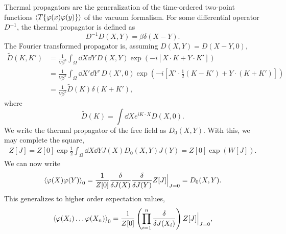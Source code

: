 Thermal propagators are the generalization of the time-ordered two-point functions $\left\langle T\{\varphi(x) \varphi(y) \} \right\rangle$ of the vacuum formalism.
For some differential operator $D^{-1}$, the thermal propagator is defined as
\begin{equation}
    D^{-1} D(X, Y) = \beta \delta(X - Y).
\end{equation}
%
The Fourier transformed propagator is, assuming $D(X, Y) = D(X-Y, 0)$,
\begin{align}
    \nonumber
    \tilde D(K, K') 
    & = \frac{1}{V \beta^3} \int_{\Omega} \dd X \dd Y \, 
    D(X, Y) \exp(- i [X\cdot K + Y\cdot K']) \\ \nonumber
    & = \frac{1}{V \beta^3} \int_{\Omega} \dd X' \dd Y' \, D(X', 0) 
    \exp(- i [X'\cdot \frac{1}{2} (K - K') + Y\cdot (K + K')]) \\
    & = \frac{1}{V \beta^2} \tilde D(K) \delta(K + K'),
\end{align}
where
\begin{equation}
    \tilde D(K) = \int \dd X e^{iK\cdot X} D(X, 0).
\end{equation}
%
We write the thermal propagator of the free field as $D_0(X, Y)$.
With this, we may complete the square,
\begin{align}
    Z[J] = Z[0]\exp{\frac{1}{2} \int_{\Omega} \dd X \dd Y J(X) D_0(X, Y) J(Y)}
    = Z[0] \exp(W[J]).
\end{align}
We can now write
\begin{equation}
    \left\langle \varphi(X)\varphi(Y) \right\rangle_0 
    = \frac{1}{Z[0]}
    \frac{\delta}{\delta J(X)} \frac{\delta}{\delta J(Y)} 
    Z[J] \Big|_{J=0} 
    = D_0(X, Y).
\end{equation}
%
This generalizes to higher order expectation values,
\begin{equation}
    \left\langle \varphi(X_i) \dots \varphi(X_n) \right\rangle_0
    = \frac{1}{Z[0]} \left(\prod_{i=1}^n \frac{\delta}{\delta J(X_i)}\right) 
    Z[J] \Big|_{J=0},
\end{equation}
%

